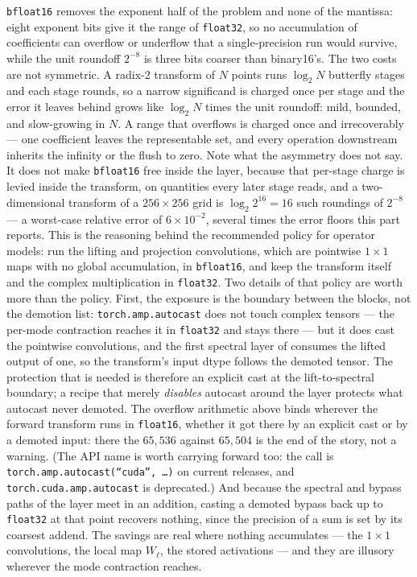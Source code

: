 \texttt{bfloat16} removes the exponent half of the problem and none of the mantissa: eight
exponent bits give it the range of \texttt{float32}, so no accumulation of coefficients can
overflow or underflow that a single-precision run would survive, while the unit roundoff
$2^{-8}$ is three bits coarser than binary16's. The two costs are not symmetric. A radix-2
transform of $N$ points runs $\log_2 N$ butterfly stages and each stage rounds, so a narrow
significand is charged once per stage and the error it leaves behind grows like $\log_2 N$
times the unit roundoff: mild, bounded, and slow-growing in $N$. A range that overflows is
charged once and irrecoverably --- one coefficient leaves the representable set, and every
operation downstream inherits the infinity or the flush to zero. Note what the asymmetry does
not say. It does not make \texttt{bfloat16} free inside the layer, because that per-stage
charge is levied inside the transform, on quantities every later stage reads, and a
two-dimensional transform of a $256\times256$ grid is $\log_2 2^{16} = 16$ such roundings of
$2^{-8}$ --- a worst-case relative error of $6\times10^{-2}$, several times the error floors
this part reports. This is the reasoning behind the recommended policy for operator
models: run the lifting and projection convolutions, which are pointwise $1\times1$
maps with no global accumulation, in \texttt{bfloat16}, and keep the transform itself and the
complex multiplication in \texttt{float32}. Two details of that policy are worth more than
the policy. First, the exposure is the boundary between the blocks, not the demotion list:
\texttt{torch.amp.autocast} does not touch complex tensors --- the per-mode contraction
reaches it in \texttt{float32} and stays there --- but it does cast the pointwise
convolutions, and the first spectral layer of
 consumes the lifted output of
one, so the transform's input dtype follows the demoted tensor. The protection that is
needed is therefore an explicit cast at the lift-to-spectral boundary; a recipe that merely
\emph{disables} autocast around the layer protects what autocast never demoted. The
overflow arithmetic above binds wherever the forward transform runs in \texttt{float16},
whether it got there by an explicit cast or by a demoted input:
there the $65{,}536$ against $65{,}504$ is the end of the story, not
a warning. (The API name is worth carrying forward too: the call is
\texttt{torch.amp.autocast(``cuda'', \ldots)} on current releases, and
\texttt{torch.cuda.amp.autocast} is deprecated.) And
because the spectral and bypass paths of the layer meet in an addition, casting a demoted
bypass back up to \texttt{float32} at that point recovers nothing, since the precision of a
sum is set by its coarsest addend. The savings are real where nothing accumulates --- the
$1\times1$ convolutions, the local map $W_\ell$, the stored activations --- and they are
illusory wherever the mode contraction reaches. 

